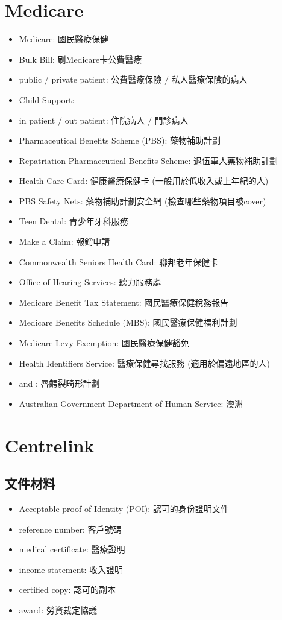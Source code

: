 \section{Medicare}
\begin{itemize}
  \itemsep0em
  \item Medicare: 國民醫療保健
  \item Bulk Bill: 刷Medicare卡公費醫療
  \item public / private patient: 公費醫療保險 / 私人醫療保險的病人
  \item Child Support: 
  \item in patient / out patient: 住院病人 / 門診病人
  \item Pharmaceutical Benefits Scheme (PBS): 藥物補助計劃
  \item Repatriation Pharmaceutical Benefits Scheme: 退伍軍人藥物補助計劃
  \item Health Care Card: 健康醫療保健卡 (一般用於低收入或上年紀的人)
  \item PBS Safety Nets: 藥物補助計劃安全網 (檢查哪些藥物項目被cover)
  \item Teen Dental: 青少年牙科服務
  \item Make a Claim: 報銷申請
  \item Commonwealth Seniors Health Card: 聯邦老年保健卡
  \item Office of Hearing Services: 聽力服務處
  \item Medicare Benefit Tax Statement: 國民醫療保健稅務報告
  \item Medicare Benefits Schedule (MBS): 國民醫療保健福利計劃
  \item Medicare Levy Exemption: 國民醫療保健豁免
  \item Health Identifiers Service: 醫療保健尋找服務 (適用於偏遠地區的人)
  \item {} and : 唇齶裂畸形計劃
  \item Australian Government Department of Human Service: 澳洲
\end{itemize}

\section{Centrelink}
\subsection*{文件材料}
\begin{multicols}{2}
\begin{itemize}
  \itemsep0em
  \item Acceptable proof of Identity (POI): 認可的身份證明文件
  \item reference number: 客戶號碼
  \item medical certificate: 醫療證明
  \item income statement: 收入證明
  \item certified copy: 認可的副本
  \item award: 勞資裁定協議
\end{itemize}
\end{multicols}

